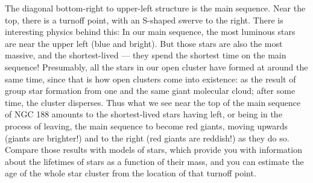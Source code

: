 \documentclass[twocolumn,apj]{openjournal}
\begin{document}
The diagonal bottom-right to upper-left structure is the main sequence. Near the top, there is a turnoff point, with an S-shaped swerve to the right. There is interesting physics behind this: In our main sequence, the most luminous stars are near the upper left (blue and bright). But those stars are also the most massive, and the shortest-lived --- they spend the shortest time on the main sequence! Presumably, all the stars in our open cluster have formed at around the same time, since that is how open clusters come into existence: as the result of group star formation from one and the same giant molecular cloud; after some time, the cluster disperses. Thus what we see near the top of the main sequence of NGC 188 amounts to the shortest-lived stars having left, or being in the process of leaving, the main sequence to become red giants, moving upwards (giants are brighter!) and to the right (red giants are reddish!) as they do so. Compare those results with models of stars, which provide you with information about the lifetimes of stars as a function of their mass, and you can estimate the age of the whole star cluster from the location of that turnoff point.
\end{document}
